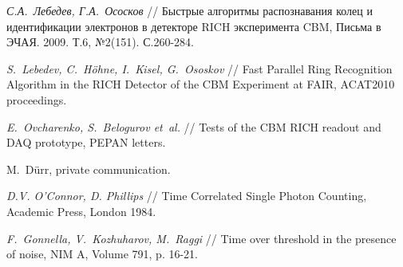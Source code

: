 \begin{thebibliography}{99}
\textit{С.А.~Лебедев, Г.А.~Ососков} //
Быстрые алгоритмы распознавания колец и идентификации электронов в детекторе RICH эксперимента CBM,
Письма в ЭЧАЯ. 2009. Т.6, №2(151). С.260-284.

\textit{S.~Lebedev, C.~H\"{o}hne, I.~Kisel, G.~Ososkov} //
Fast Parallel Ring Recognition Algorithm in the RICH Detector of the CBM Experiment at FAIR,
ACAT2010 proceedings.

\textit{E.~Ovcharenko, S.~Belogurov et~al.} //
Tests of the CBM RICH readout and DAQ prototype,
PEPAN letters.

M.~D\"urr, private communication.

\textit{D.V. O’Connor, D. Phillips} //
Time Correlated Single Photon Counting, Academic Press, London 1984.

\textit{F.~Gonnella, V.~Kozhuharov, M.~Raggi} //
Time over threshold in the presence of noise,
NIM A, Volume 791, p. 16-21.

\end{thebibliography}

